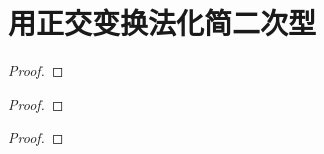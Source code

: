 \documentclass[../../main.tex]{subfiles}
\begin{document}
\section{用正交变换法化简二次型}

\begin{proposition}\label{proposition:例9.48}

\end{proposition}
\begin{proof}


\end{proof}

\begin{proposition}\label{proposition:例9.49}

\end{proposition}
\begin{proof}


\end{proof}

\begin{proposition}\label{proposition:例9.50}

\end{proposition}
\begin{proof}


\end{proof}
\end{document}
